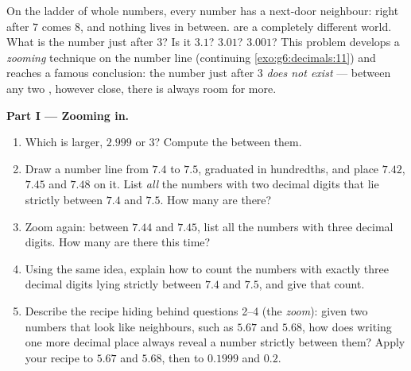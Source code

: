 \begin{problem}
\label{pb:g6:decimals:1}
On the ladder of whole numbers, every number has a next-door
neighbour: right after $7$ comes $8$, and nothing lives in
between.  are a completely different world. What is
the number just after $3$? Is it $3.1$? $3.01$? $3.001$? This
problem develops a \emph{zooming} technique on the number line
(continuing \cref{exo:g6:decimals:11}) and reaches a famous
conclusion: the number just after $3$ \emph{does not exist} ---
between any two , however close, there is always
room for more.

\medskip
\noindent\textbf{Part I --- Zooming in.}
\begin{enumerate}
  \item Which is larger, $2.999$ or $3$? Compute the 
        between them.
  \item Draw a number line from $7.4$ to $7.5$, graduated in
        hundredths, and place $7.42$, $7.45$ and $7.48$ on it.
        List \emph{all} the numbers with two decimal digits that
        lie strictly between $7.4$ and $7.5$. How many are there?
  \item Zoom again: between $7.44$ and $7.45$, list all the
        numbers with three decimal digits. How many are there
        this time?
  \item Using the same idea, explain how to count the numbers
        with exactly three decimal digits lying strictly between
        $7.4$ and $7.5$, and give that count.
  \item Describe the recipe hiding behind questions 2--4 (the
        \emph{zoom}): given two numbers that look like
        neighbours, such as $5.67$ and $5.68$, how does writing
        one more decimal place always reveal a number strictly
        between them? Apply your recipe to $5.67$ and $5.68$,
        then to $0.1999$ and $0.2$.
\end{enumerate}


\end{problem}
